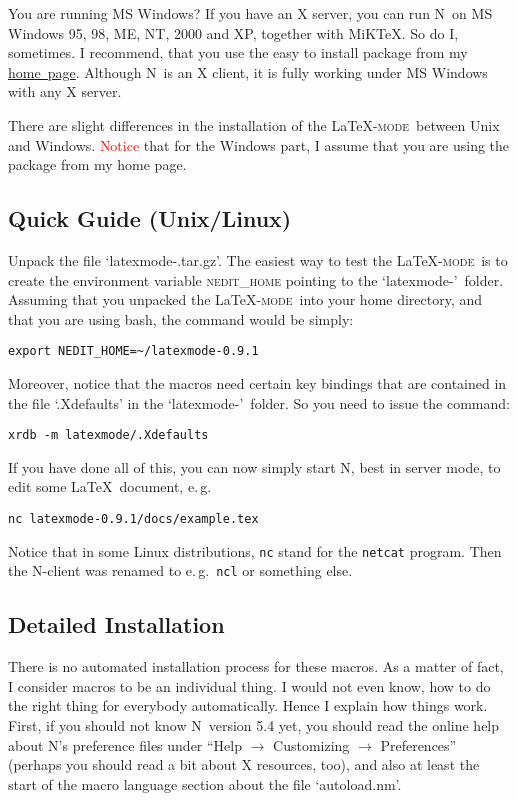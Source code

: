 \documentclass{article}
\newcommand{\latexpack}{\LaTeX-\textsc{mode}}
\newcommand{\nedit}{N\kern-0.8pt{Edit}}
\newcommand{\myhome}{\href{http://nedit.gmxhome.de}{home~page}}
\newcommand{\file}[1]{`#1'}
\newcommand{\menu}[1]{``#1''}
\newcommand{\latexpackfile}{\file{latexmode-\lversion.tar.gz}}
\newcommand{\latexpackfolder}{\file{latexmode-\lversion}}
\begin{document}
You are running MS Windows? If you have an X server, you can run \nedit\ on MS Windows 95, 98, ME, NT, 2000 and XP, together with MiK\TeX. So do I, sometimes. I recommend, that you use the easy to install package from my \myhome. 
Although \nedit\ is an X client, it is fully working under MS Windows with any X server.

There are slight differences in the installation of the \latexpack\ between Unix and Windows. \textcolor{red}{Notice} that for the Windows part, I assume that you are using the package from my home page.


\subsection{Quick Guide (Unix/Linux)} 
Unpack the file \latexpackfile. The easiest way to test the \latexpack\ is to create the environment variable \textsc{nedit\_home} pointing to the \latexpackfolder\ folder. Assuming that you unpacked the \latexpack\ into your home directory, and that you are using bash, the command would be simply:%
\begin{verbatim}
export NEDIT_HOME=~/latexmode-0.9.1
\end{verbatim}%
\noindent Moreover, notice that the macros need certain key bindings that are contained in the file \file{.Xdefaults} in the \latexpackfolder\ folder. So you need to issue the command:%
\begin{verbatim}
xrdb -m latexmode/.Xdefaults
\end{verbatim}
\noindent If you have done all of this, you can now simply start \nedit, best in server mode, to edit some \LaTeX\ document, e.\,g.%
\begin{verbatim}
nc latexmode-0.9.1/docs/example.tex
\end{verbatim}
\noindent Notice that in some Linux distributions, \verb|nc| stand for the \verb|netcat| program. Then the \nedit-client was renamed to e.\,g.~\verb|ncl| or something else.

\subsection{Detailed Installation} 
There is no automated installation process for these macros. As a matter of fact, I consider macros to be an individual thing. I would not even know, how to do the right thing for everybody automatically. Hence I explain how things work. First, if you should not know \nedit\ version 5.4 yet, you should read the online help about \nedit's preference files under \menu{Help $\to$  Customizing $\to $ Preferences} (perhaps you should read a bit about X resources, too), and also at least the start of the macro language section about the file \file{autoload.nm}.
\end{document}
